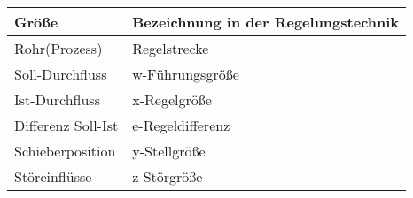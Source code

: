 \documentclass[a4paper, 11pt]{scrartcl}
\theoremstyle{definition}
\begin{document}
\begin{tabular}{|l|l|}
	\hline
	\textbf{Größe}& \textbf{Bezeichnung in der Regelungstechnik}\\
	\hline
	Rohr(Prozess)& Regelstrecke\\
	Soll-Durchfluss& w-Führungsgröße\\
	Ist-Durchfluss& x-Regelgröße\\
	Differenz Soll-Ist& e-Regeldifferenz\\
	Schieberposition& y-Stellgröße\\
	Störeinflüsse& z-Störgröße\\
	\hline
\end{tabular}
\end{document}
